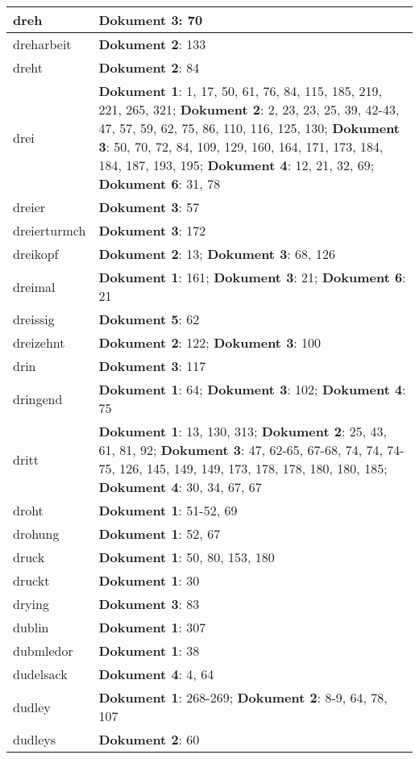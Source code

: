 \documentclass[a5paper]{article}
\begin{document}
\begin{longtable}[l]{|l|p{3in}|}
\hline
dreh & \textbf{Dokument 3}: 70 \\
\hline
dreharbeit & \textbf{Dokument 2}: 133 \\
\hline
dreht & \textbf{Dokument 2}: 84 \\
\hline
drei & \textbf{Dokument 1}: 1, 17, 50, 61, 76, 84, 115, 185, 219, 221, 265, 321; \textbf{Dokument 2}: 2, 23, 23, 25, 39, 42-43, 47, 57, 59, 62, 75, 86, 110, 116, 125, 130; \textbf{Dokument 3}: 50, 70, 72, 84, 109, 129, 160, 164, 171, 173, 184, 184, 187, 193, 195; \textbf{Dokument 4}: 12, 21, 32, 69; \textbf{Dokument 6}: 31, 78 \\
\hline
dreier & \textbf{Dokument 3}: 57 \\
\hline
dreierturmch & \textbf{Dokument 3}: 172 \\
\hline
dreikopf & \textbf{Dokument 2}: 13; \textbf{Dokument 3}: 68, 126 \\
\hline
dreimal & \textbf{Dokument 1}: 161; \textbf{Dokument 3}: 21; \textbf{Dokument 6}: 21 \\
\hline
dreissig & \textbf{Dokument 5}: 62 \\
\hline
dreizehnt & \textbf{Dokument 2}: 122; \textbf{Dokument 3}: 100 \\
\hline
drin & \textbf{Dokument 3}: 117 \\
\hline
dringend & \textbf{Dokument 1}: 64; \textbf{Dokument 3}: 102; \textbf{Dokument 4}: 75 \\
\hline
dritt & \textbf{Dokument 1}: 13, 130, 313; \textbf{Dokument 2}: 25, 43, 61, 81, 92; \textbf{Dokument 3}: 47, 62-65, 67-68, 74, 74, 74-75, 126, 145, 149, 149, 173, 178, 178, 180, 180, 185; \textbf{Dokument 4}: 30, 34, 67, 67 \\
\hline
droht & \textbf{Dokument 1}: 51-52, 69 \\
\hline
drohung & \textbf{Dokument 1}: 52, 67 \\
\hline
druck & \textbf{Dokument 1}: 50, 80, 153, 180 \\
\hline
druckt & \textbf{Dokument 1}: 30 \\
\hline
drying & \textbf{Dokument 3}: 83 \\
\hline
dublin & \textbf{Dokument 1}: 307 \\
\hline
dubmledor & \textbf{Dokument 1}: 38 \\
\hline
dudelsack & \textbf{Dokument 4}: 4, 64 \\
\hline
dudley & \textbf{Dokument 1}: 268-269; \textbf{Dokument 2}: 8-9, 64, 78, 107 \\
\hline
dudleys & \textbf{Dokument 2}: 60 \\

\end{longtable}
\end{document}
